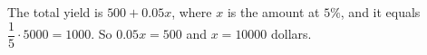The total yield is $500+0.05x$, where $x$ is the amount at $5\%$, and it equals $\dfrac15\cdot5000=1000$. So $0.05x=500$ and $x=\boxed{10000}$ dollars.
